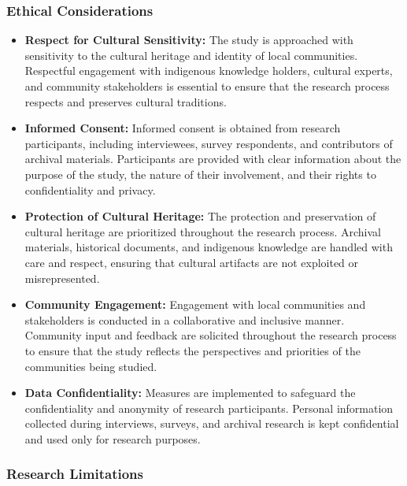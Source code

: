 \subsubsection{Ethical Considerations}

\begin{itemize}
    \item \textbf{Respect for Cultural Sensitivity:} The study is approached with sensitivity to the cultural heritage and identity of local communities. Respectful engagement with indigenous knowledge holders, cultural experts, and community stakeholders is essential to ensure that the research process respects and preserves cultural traditions.
    
    \item \textbf{Informed Consent:} Informed consent is obtained from research participants, including interviewees, survey respondents, and contributors of archival materials. Participants are provided with clear information about the purpose of the study, the nature of their involvement, and their rights to confidentiality and privacy.
    
    \item \textbf{Protection of Cultural Heritage:} The protection and preservation of cultural heritage are prioritized throughout the research process. Archival materials, historical documents, and indigenous knowledge are handled with care and respect, ensuring that cultural artifacts are not exploited or misrepresented.
    
    \item \textbf{Community Engagement:} Engagement with local communities and stakeholders is conducted in a collaborative and inclusive manner. Community input and feedback are solicited throughout the research process to ensure that the study reflects the perspectives and priorities of the communities being studied.
    
    \item \textbf{Data Confidentiality:} Measures are implemented to safeguard the confidentiality and anonymity of research participants. Personal information collected during interviews, surveys, and archival research is kept confidential and used only for research purposes.
\end{itemize}

\subsubsection{Research Limitations}

